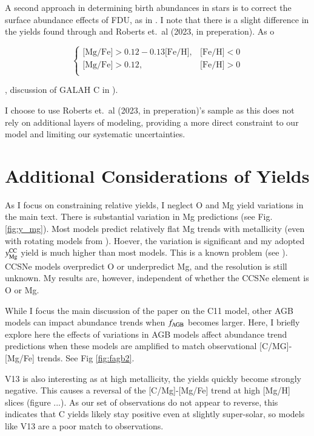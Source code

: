 \documentclass[12pt,oneside]{report}
\newcommand{\Yoc}{\ensuremath{y_{\rm Mg}^{\rm CC}}}
\newcommand{\citetjack}{Roberts et.\ al (2023, in preperation)}
\begin{document}
A second approach in determining birth abundances in stars is to correct the surface abundance effects of FDU, as in \cite{vincenzo+21}. I note that there is a slight difference in the yields found through \cite{vincenzo+21} and \citetjack. As o

\begin{equation}\label{eq:high_alpha}
\begin{cases}
\text{[Mg/Fe]} >0.12-0.13\text{[Fe/H]}, & \text{[Fe/H]}<0\\
\text{[Mg/Fe]} >0.12, & \text{[Fe/H]}>0\\
\end{cases}
\end{equation}

, discussion of GALAH C in \citealt{emily+19}).


I choose to use \citetjack's sample as this does not rely on additional layers of modeling, providing a more direct constraint to our model and limiting our systematic uncertainties.

\newpage
\section{Additional Considerations of Yields}\label{sec:alt_agb}

As I focus on constraining relative yields, I neglect O and Mg yield variations in the main text. There is substantial variation in Mg predictions (see Fig. \ref{fig:y_mg}). Most models predict relatively flat Mg trends with metallicity (even with rotating models from \citealt{LC18}). Hoever, the variation is significant and my adopted $\Yoc$ yield is much higher than most models. This is a known problem (see \citet{emily+21}). CCSNe models overpredict O or underpredict Mg, and the resolution is still unknown. 
My results are, however, independent of whether the CCSNe element is O or Mg.

While I focus the main discussion of the paper on the C11 model, other AGB models can impact abundance trends when $f_{\rm AGB}$ becomes larger.
Here, I briefly explore here the effects of variations in AGB models affect abundance trend predictions when these models are amplified to match observational [C/MG]-[Mg/Fe] trends. 
See Fig \ref{fig:fagb2}.

V13 is also interesting as at high metallicity, the yields quickly become strongly negative. This causes a reversal of the [C/Mg]-[Mg/Fe] trend at high [Mg/H] slices (figure ...). As our set of observations do not appear to reverse, this indicates that C yields likely stay positive even at slightly super-solar, so models like V13 are a poor match to observations. 
\end{document}
